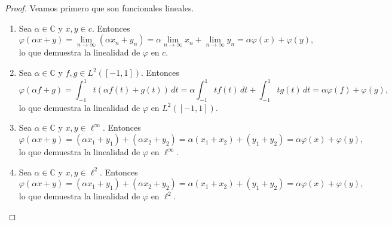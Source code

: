 \documentclass{article}
\theoremstyle{definition}
\newcommand{\C}{\mathbb{C}}
\begin{document}
\begin{proof}
    Veamos primero que son funcionales lineales.\begin{enumerate}
        \item Sea \( \alpha \in \C \) y \( x, y \in c \). Entonces
              \[
                  \varphi(\alpha x + y) = \lim_{n\to\infty} (\alpha x_n + y_n) = \alpha \lim_{n\to\infty} x_n + \lim_{n\to\infty} y_n = \alpha \varphi(x) + \varphi(y),
              \]
              lo que demuestra la linealidad de \( \varphi \) en \(c\).
        \item Sea \( \alpha \in \C \) y \( f, g \in L^2([-1,1]) \). Entonces
              \[
                  \varphi(\alpha f + g) = \int_{-1}^1 t(\alpha f(t) + g(t))\,dt = \alpha \int_{-1}^1 t f(t)\,dt + \int_{-1}^1 t g(t)\,dt = \alpha \varphi(f) + \varphi(g),
              \]
              lo que demuestra la linealidad de \( \varphi \) en \(L^2([-1,1])\).
        \item Sea \( \alpha \in \C \) y \( x, y \in \ell^\infty \). Entonces
              \[
                  \varphi(\alpha x + y) = (\alpha x_1 + y_1) + (\alpha x_2 + y_2) = \alpha (x_1 + x_2) + (y_1 + y_2) = \alpha \varphi(x) + \varphi(y),
              \]
              lo que demuestra la linealidad de \( \varphi \) en \(\ell^\infty \).
        \item Sea \( \alpha \in \C \) y \( x, y \in \ell^2 \). Entonces
              \[
                  \varphi(\alpha x + y) = (\alpha x_1 + y_1) + (\alpha x_2 + y_2) = \alpha (x_1 + x_2) + (y_1 + y_2) = \alpha \varphi(x) + \varphi(y),
              \]
              lo que demuestra la linealidad de \( \varphi \) en \(\ell^2\).
    \end{enumerate}


\end{proof}
\end{document}

